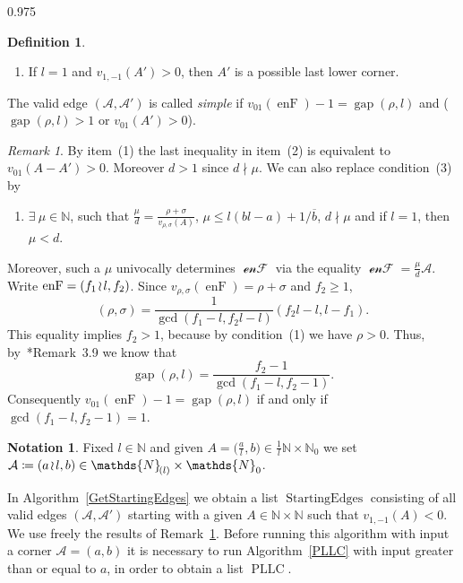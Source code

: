\documentclass[reqno,a4paper,twoside]{amsart}
\theoremstyle{definition}
\newtheorem{definition}[theorem]{Definition}
\newtheorem{notation}[theorem]{Notation}
\theoremstyle{remark}
\newtheorem{remark}[theorem]{Remark}
\DeclareMathOperator{\gap}{gap}
\newcommand{\ov}{\overline}
\DeclareMathOperator{\StartingEdges}{StartingEdges}
\DeclareMathOperator{\PLLC}{PLLC}
\DeclareMathOperator{\enF}{enF}
\newcommand{\wrs}{\hspace{-0.9pt}\wr\hspace{-0.9pt}}
\begin{document}
\begin{spacing}{0.975}
\begin{definition}
\begin{enumerate}[itemsep=1.0ex,topsep=1.0ex]
\item If $l=1$ and $v_{1,-1}(A')>0$, then $A'$ is a possible last lower corner.

\end{enumerate}
The valid edge $(\mathcal{A},\mathcal{A}')$ is called {\em simple} if $v_{01}(\enF)-1=\gap(\rho,l)$ and ($\gap(\rho,l)>1$ or $v_{01}(A')>0$).
\end{definition}

\begin{remark}\label{zazaza}
By item~(1) the last inequality in item~(2) is equivalent to $v_{01}(A-A')>0$. Moreover $d>1$ since $d\nmid \mu$. We can also replace condition~(3) by

\begin{enumerate}[itemsep=1.0ex,topsep=1.0ex]

\item[(3')] $\exists\ \mu\in \mathds{N}$, such that $\frac{\mu}{d}=\frac{\rho+\sigma}{v_{\rho,\sigma}(A)}$, $\mu\le l(bl-a)+1/\ov b$, $d\nmid \mu$ and if $l=1$, then $\mu<d$.

\end{enumerate}
Moreover, such a $\mu$ univocally determines $\mathcal{\enF}$ via the equality $\mathcal{\enF} = \frac{\mu}{d}\mathcal{A}$. Write $\mathcal{\enF}=(f_1\wrs l,f_2)$. Since $v_{\rho,\sigma}(\enF) = \rho+\sigma$ and $f_2\ge 1$,
$$
(\rho,\sigma) = \frac{1}{\gcd(f_1-l,f_2l-l)}(f_2l-l,l-f_1).
$$
This equality implies $f_2>1$, because by condition~(1) we have $\rho>0$. Thus, by~\cite{GGV2}*{Remark~3.9} we know that
$$
\gap(\rho,l) = \frac{f_2-1}{\gcd(f_1-l,f_2-1)}.
$$
Consequently $v_{01}(\enF) -1= \gap(\rho,l)$ if and only if $\gcd(f_1-l,f_2-1)=1$.
\end{remark}

\begin{notation}
Fixed $l\in \mathds{N}$ and given $A = \bigl(\frac{a}{l},b\bigr)\in \frac{1}{l}\mathds{N}\times \mathds{N}_0$ we set $\mathcal{A}\coloneqq (a\wrs l,b)\in \mathds{N}_{\!(l)}\times \mathds{N}_0$.
\end{notation}

In Algorithm~\ref{GetStartingEdges} we obtain a list $\StartingEdges$ consisting of all valid edges $(\mathcal{A},\mathcal{A}')$ starting with a given $A\in \mathds{N}\times \mathds{N}$ such that $v_{1,-1}(A)<0$. We use freely the results of Remark~\ref{zazaza}. Before running this algorithm with input a corner $\mathcal{A}=(a,b)$ it is necessary to run Algorithm~\ref{PLLC} with input greater than or equal to $a$, in order to obtain a list $\PLLC$.


\end{spacing}
\end{document}
